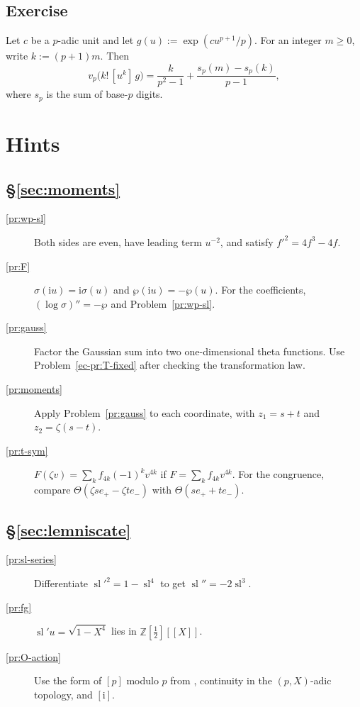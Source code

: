 \documentclass[reqno]{amsart}
\theoremstyle{definition}
\theoremstyle{plain}
\newcommand{\Z}{\mathbb{Z}}
\newcommand{\ii}{\mathrm{i}}
\newcommand{\sll}{\operatorname{sl}}
\begin{document}
\subsection*{Exercise}
Let \(c\) be a \(p\)-adic unit and let \(g(u) := \exp(c u^{p+1}/p)\).  For an integer \(m \ge 0\), write \(k := (p+1)m\).  Then
\[
  v_p\bigl(k!\, [u^k]\, g\bigr) = \frac{k}{p^2 - 1} + \frac{s_p(m) - s_p(k)}{p-1},
\]
where \(s_p\) is the sum of base-\(p\) digits.

\section*{Hints}

\subsection*{\S\ref{sec:moments}}
\begin{description}
\item[\ref{pr:wp-sl}] Both sides are even, have leading term \(u^{-2}\), and satisfy \(f'^2 = 4f^3 - 4f\).
\item[\ref{pr:F}] \(\sigma(\ii u) = \ii\sigma(u)\) and \(\wp(\ii u) = -\wp(u)\).  For the coefficients, \((\log\sigma)'' = -\wp\) and Problem~\ref{pr:wp-sl}.
\item[\ref{pr:gauss}] Factor the Gaussian sum into two one-dimensional theta functions.  Use Problem~\ref{ec-pr:T-fixed} after checking the transformation law.
\item[\ref{pr:moments}] Apply Problem~\ref{pr:gauss} to each coordinate, with \(z_1 = s + t\) and \(z_2 = \zeta(s - t)\).
\item[\ref{pr:t-sym}] \(F(\zeta v) = \sum_k f_{4k} (-1)^k v^{4k}\) if \(F = \sum_k f_{4k} v^{4k}\).  For the congruence, compare \(\Theta(\zeta s e_+ - \zeta t e_-)\) with \(\Theta(s e_+ + t e_-)\).
\end{description}

\subsection*{\S\ref{sec:lemniscate}}
\begin{description}
\item[\ref{pr:sl-series}] Differentiate \(\sll'^2 = 1 - \sll^4\) to get \(\sll'' = -2\sll^3\).
\item[\ref{pr:fg}] \(\sll' u = \sqrt{1 - X^4}\) lies in \(\Z[\tfrac12][[X]]\).
\item[\ref{pr:O-action}] Use the form of \([p]\) modulo \(p\) from \cite[\S IV.7]{Si1}, continuity in the \((p,X)\)-adic topology, and \([\ii]\).
\end{description}
\end{document}
